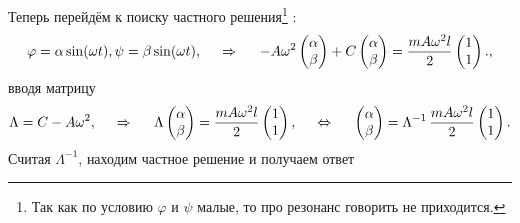 Теперь перейдём к поиску частного решения\footnote{
    Так как по условию $\varphi$ и $\psi$ малые, то про резонанс говорить не приходится.
} :
\begin{equation*}
    \varphi = \alpha \sin (\omega t), 
    \psi = \beta \sin (\omega t),
    \hspace{0.5cm} \Rightarrow \hspace{0.5cm}
    -A \omega^2 \begin{pmatrix}
        \alpha \\ \beta
    \end{pmatrix} + C \begin{pmatrix}
        \alpha \\ \beta
    \end{pmatrix} = 
    \frac{m A \omega^2 l}{2} \begin{pmatrix}
        1   \\ 1
    \end{pmatrix}.,
\end{equation*}
вводя матрицу
\begin{equation*}
    \Lambda = C - A \omega^2,
    \hspace{0.5cm} \Rightarrow \hspace{0.5cm}
    \Lambda \begin{pmatrix}
        \alpha \\ \beta
    \end{pmatrix} = 
    \frac{m A \omega^2 l}{2} \begin{pmatrix}
        1 \\ 1
    \end{pmatrix},
    \hspace{0.5cm} \Leftrightarrow \hspace{0.5cm}   
    \begin{pmatrix}
        \alpha \\ \beta
    \end{pmatrix} 
    =
     \Lambda^{-1} \,
    \frac{m A \omega^2 l}{2} \begin{pmatrix}
        1 \\ 1
    \end{pmatrix}.
\end{equation*}
Считая $\Lambda^{-1}$, находим частное решение и получаем ответ
